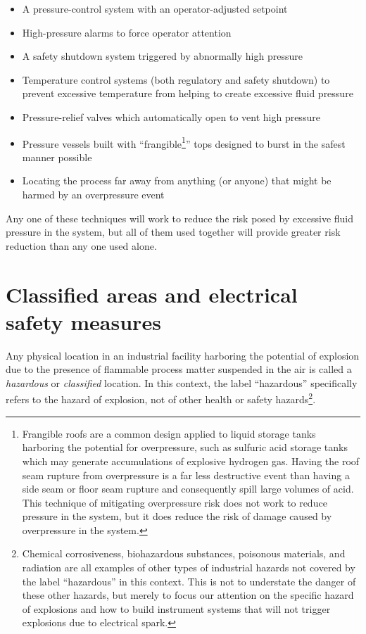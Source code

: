 \begin{itemize}
\item A pressure-control system with an operator-adjusted setpoint
\item High-pressure alarms to force operator attention 
\item A safety shutdown system triggered by abnormally high pressure
\item Temperature control systems (both regulatory and safety shutdown) to prevent excessive temperature from helping to create excessive fluid pressure
\item Pressure-relief valves which automatically open to vent high pressure
\item Pressure vessels built with ``frangible\footnote{Frangible roofs are a common design applied to liquid storage tanks harboring the potential for overpressure, such as sulfuric acid storage tanks which may generate accumulations of explosive hydrogen gas.  Having the roof seam rupture from overpressure is a far less destructive event than having a side seam or floor seam rupture and consequently spill large volumes of acid.  This technique of mitigating overpressure risk does not work to reduce pressure in the system, but it does reduce the risk of damage caused by overpressure in the system.}'' tops designed to burst in the safest manner possible
\item Locating the process far away from anything (or anyone) that might be harmed by an overpressure event
\end{itemize}

Any one of these techniques will work to reduce the risk posed by excessive fluid pressure in the system, but all of them used together will provide greater risk reduction than any one used alone.






\filbreak
\section{Classified areas and electrical safety measures}

Any physical location in an industrial facility harboring the potential of explosion due to the presence of flammable process matter suspended in the air is called a \textit{hazardous} or \textit{classified} location.  In this context, the label ``hazardous'' specifically refers to the hazard of explosion, not of other health or safety hazards\footnote{Chemical corrosiveness, biohazardous substances, poisonous materials, and radiation are all examples of other types of industrial hazards not covered by the label ``hazardous'' in this context.  This is not to understate the danger of these other hazards, but merely to focus our attention on the specific hazard of explosions and how to build instrument systems that will not trigger explosions due to electrical spark.}.    






